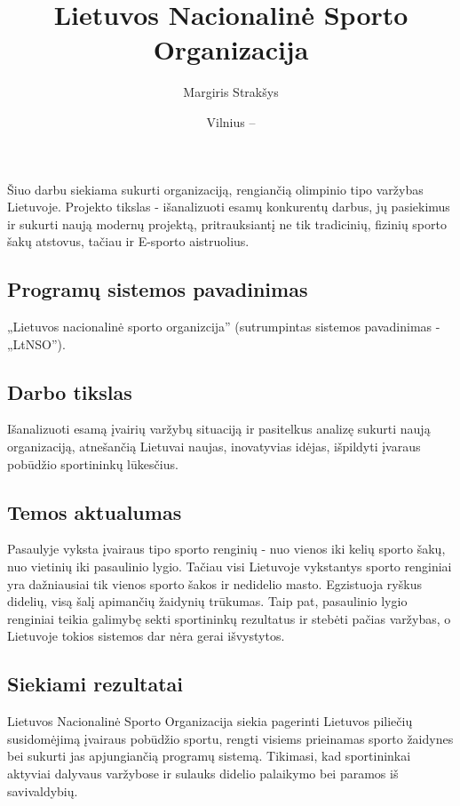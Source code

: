 \documentclass{VUMIFPSkursinis}
\title{Lietuvos Nacionalinė Sporto Organizacija }
\author{Margiris Strakšys}
\date{Vilnius – \the\year}
\begin{document}
\maketitle

\tableofcontents

 \label{anotacija}
  Šiuo darbu siekiama sukurti organizaciją, rengiančią olimpinio tipo varžybas Lietuvoje. Projekto tikslas - išanalizuoti esamų
  konkurentų darbus, jų pasiekimus ir sukurti naują modernų projektą, pritrauksiantį ne tik tradicinių, fizinių sporto šakų
  atstovus, tačiau ir E-sporto aistruolius.

 \label{ivadas}
  \subsection*{Programų sistemos pavadinimas} \label{ivadas_pavadinimas}
    „Lietuvos nacionalinė sporto organizcija” (sutrumpintas sistemos pavadinimas - „LtNSO”).

  \subsection*{Darbo tikslas} \label{ivadas_tikslas}
    Išanalizuoti esamą įvairių varžybų situaciją ir pasitelkus analizę sukurti naują
    organizaciją, atnešančią Lietuvai naujas, inovatyvias idėjas, išpildyti įvaraus pobūdžio sportininkų lūkesčius.

  \subsection*{Temos aktualumas} \label{ivadas_aktualumas}
    Pasaulyje vyksta įvairaus tipo sporto renginių - nuo vienos iki kelių sporto šakų, nuo vietinių iki pasaulinio
    lygio. Tačiau visi Lietuvoje vykstantys sporto renginiai yra dažniausiai tik vienos sporto šakos ir nedidelio masto.
    Egzistuoja ryškus didelių, visą šalį apimančių žaidynių trūkumas. Taip pat, pasaulinio lygio renginiai teikia galimybę
    sekti sportininkų rezultatus ir stebėti pačias varžybas, o Lietuvoje tokios sistemos dar nėra gerai išvystytos.

  \subsection*{Siekiami rezultatai} \label{ivadas_siekiamiRezultatai}
    Lietuvos Nacionalinė Sporto Organizacija siekia pagerinti Lietuvos piliečių susidomėjimą įvairaus pobūdžio sportu,
    rengti visiems prieinamas sporto žaidynes bei sukurti jas apjungiančią programų sistemą. Tikimasi, kad sportininkai
    aktyviai dalyvaus varžybose ir sulauks didelio palaikymo bei paramos iš savivaldybių.
\end{document}
